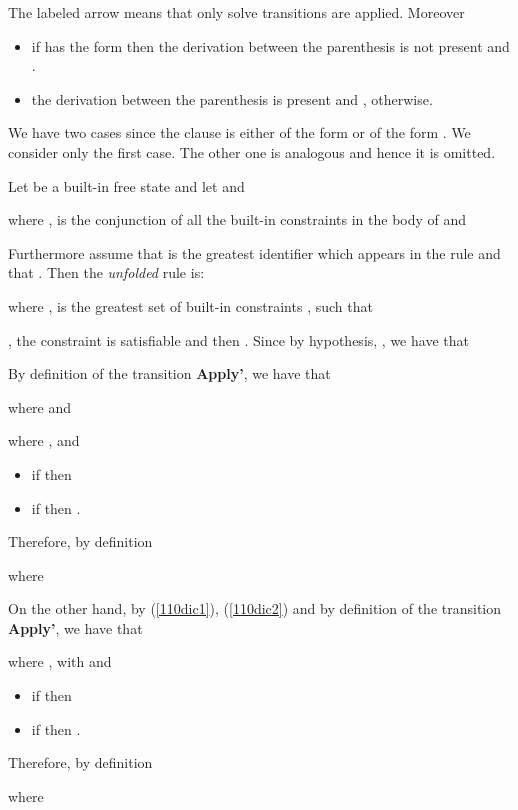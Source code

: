 \documentclass[final]{acmtrans2e}
\begin{document}
The labeled arrow  means that only solve transitions are applied.
Moreover
\begin{itemize}
           \item if  has the form
 then the derivation between the parenthesis is not present and .
           \item the derivation between the parenthesis is present and , otherwise.
         \end{itemize}
We have two cases since the clause  is either of the form 
or of the form . We consider only the first case. The other one is analogous and hence it is omitted.


 Let   be a built-in free state
and let
 and

where ,  is the conjunction of all the built-in constraints in the body
of  and

Furthermore assume that  is the greatest identifier which appears in the
rule  and that .
Then the \emph{unfolded} rule is:

where ,
 is the greatest set of built-in constraints ,
such that

, the
constraint  is satisfiable and
 then .
 Since by hypothesis, , we have that
    
 By definition of the transition \textbf{Apply'}, we have that

where  and

     where ,
      and
\begin{itemize}
    \item if  then 
    \item if  then .
    \end{itemize}
    Therefore, by definition
    
  where

On the other hand, by (\ref{110dic1}), (\ref{110dic2}) and
by definition of the transition \textbf{Apply'}, we have that

     where
     , with
      and
\begin{itemize}
    \item if  then 
    \item if  then .
    \end{itemize}
    Therefore, by definition
    
    where
    
\end{document}
